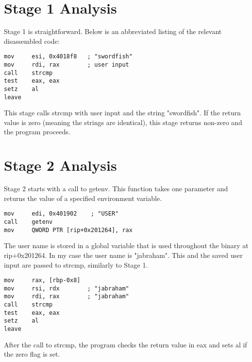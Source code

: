 \documentclass{article}
\begin{document}
\newpage
\section{Stage 1 Analysis}
\begin{flushleft}
\vspace{.5pc}
\end{flushleft}
\par
Stage 1 is straightforward.  Below is an abbreviated listing of the relevant
disassembled code:
\begin{lstlisting}
mov     esi, 0x4018f8   ; "swordfish"
mov     rdi, rax        ; user input
call    strcmp
test    eax, eax
setz    al
leave
\end{lstlisting}
\par
This stage calls strcmp with user input and the string "swordfish".  If the 
return value is zero (meaning the strings are identical), this stage returns 
non-zero and the program proceeds.

\newpage
\section{Stage 2 Analysis}
\begin{flushleft}
\vspace{.5pc}
\end{flushleft}
\par
Stage 2 starts with a call to getenv.  This function takes one parameter and 
returns the value of a specified environment variable.
\begin{lstlisting}
mov     edi, 0x401902    ; "USER"
call    getenv
mov     QWORD PTR [rip+0x201264], rax
\end{lstlisting}
\par
The user name is stored in a global variable that is used throughout the 
binary at rip+0x201264.  In my case the user name is "jabraham".  This and the 
saved user input are passed to strcmp, similarly to Stage 1.
\begin{lstlisting}
mov     rax, [rbp-0x8]
mov     rsi, rdx        ; "jabraham"
mov     rdi, rax        ; "jabraham"
call    strcmp
test    eax, eax
setz    al
leave
\end{lstlisting}
\par
After the call to strcmp, the program checks the return value in eax and sets 
al if the zero flag is set.
\end{document}
